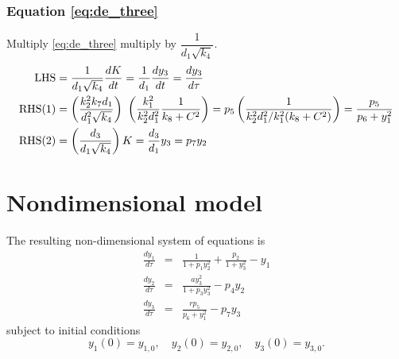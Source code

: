 \documentclass[10pt,letterpaper]{article}
\begin{document}
\subsubsection{Equation \eqref{eq:de_three}}
Multiply \eqref{eq:de_three} multiply by $\dfrac{1}{d_1 \sqrt{k_4}}$.
\begin{equation*}
\begin{gathered}\begin{aligned}
{\rm LHS} &= \frac{1}{d_1 \sqrt{k_4}} \frac{dK}{dt}
           = \frac{1}{d_1} \frac{dy_3}{dt}
           = \frac{dy_3}{d\tau} \\
{\rm RHS(1)} &= \left( \frac{k_2^2 k_7 d_1}{d_1^2 \sqrt{k_4}} \right) \
              \left(  \frac{k_1^2}{k_2^2 d_1^2} \frac{1}{k_8 + C^2} \right)
              = p_5 \left( \frac{1}{ k_2^2 d_1^2 / k_1^2 (k_8+C^2)}\right)
              = \frac{p_5}{ p_6 + y_1^2}  \\
{\rm RHS(2)} &= \left( \frac{d_3}{d_1 \sqrt{k_4}} \right) K = \frac{d_3}{d_1} y_3 = p_7 y_2
\end{aligned}\end{gathered}
\end{equation*}


\section{Nondimensional model}
The resulting non-dimensional system of equations is
\begin{eqnarray}
\frac{dy_1}{d\tau} &=& \frac{1}{1 + p_1 y_2^2} + \frac{p_2}{1 + y_3^2} - y_1  \label{nondim_de_one} \\
\frac{dy_2}{d\tau} &=& \frac{a y_3^2}{1 + p_3 y_3^2} - p_4 y_2 \label{nondim_de_two} \\
\frac{dy_3}{d\tau} &=& \frac{r p_5}{p_6 + y_1^2} - p_7 y_3 \label{nondim_de_three}
\end{eqnarray}
subject to initial conditions
\begin{equation}
y_1(0) = y_{1,0}, \quad y_2(0) = y_{2,0}, \quad y_3(0) = y_{3,0}.
\end{equation}



\end{document}
